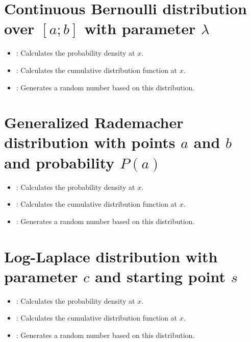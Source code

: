 \section{Continuous Bernoulli distribution over \texorpdfstring{$[a;b]$}{[a;b]} with parameter \texorpdfstring{$\lambda$}{lambda}}

\begin{itemize}

\item
{}:
Calculates the probability density at $x$.

\item
{}:
Calculates the cumulative distribution function at $x$.

\item
{}:
Generates a random number based on this distribution.

\end{itemize}



\section{Generalized Rademacher distribution with points \texorpdfstring{$a$}{a} and \texorpdfstring{$b$}{b} and probability \texorpdfstring{$P(a)$}{P(a)}}

\begin{itemize}

\item
{}:
Calculates the probability density at $x$.

\item
{}:
Calculates the cumulative distribution function at $x$.

\item
{}:
Generates a random number based on this distribution.

\end{itemize}



\section{Log-Laplace distribution with parameter \texorpdfstring{$c$}{c} and starting point \texorpdfstring{$s$}{s}}

\begin{itemize}

\item
{}:
Calculates the probability density at $x$.

\item
{}:
Calculates the cumulative distribution function at $x$.

\item
{}:
Generates a random number based on this distribution.

\end{itemize}



